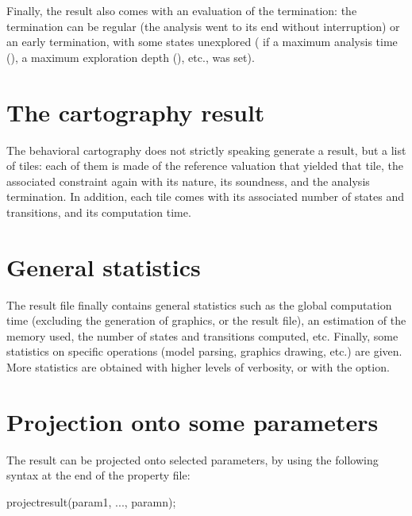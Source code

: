 Finally, the result also comes with an evaluation of the termination: the termination can be regular (the analysis went to its end without interruption) or an early termination, with some states unexplored (\eg{} if a maximum analysis time (), a maximum exploration depth (), etc., was set).


\section{The cartography result}

The behavioral cartography does not strictly speaking generate a result, but a list of tiles: each of them is made of the reference valuation that yielded that tile, the associated constraint again with its nature, its soundness, and the analysis termination.
In addition, each tile comes with its associated number of states and transitions, and its computation time.



\section{General statistics}

The result file finally contains general statistics such as the global computation time (excluding the generation of graphics, or the result file), an estimation of the memory used, the number of states and transitions computed, etc.
Finally, some statistics on specific operations (model parsing, graphics drawing, etc.) are given.
More statistics are obtained with higher levels of verbosity, or with the  option.

\section{Projection onto some parameters}\label{section:projection}
The result can be projected onto selected parameters, by using the following syntax at the end of the property file:

\begin{IMITATORmodel}
projectresult(param1, ..., paramn);
\end{IMITATORmodel}


